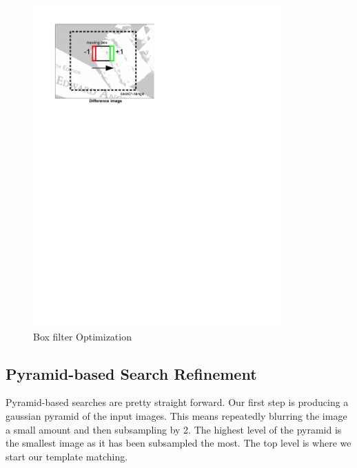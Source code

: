 \begin{figure}[h]
\begin{center}
  \includegraphics[trim = 0in 8in 3.5in 0in, width=3.75in]{images/stereo/boxfilter.pdf}
\end{center}
  \caption{Box filter Optimization}
  \label{fig:box_filter}
\end{figure}

\subsection{Pyramid-based Search Refinement}

Pyramid-based searches are pretty straight forward. Our first step is
producing a gaussian pyramid of the input images. This means
repeatedly blurring the image a small amount and then subsampling by
2. The highest level of the pyramid is the smallest image as it has
been subsampled the most. The top level is where we start our template
matching.

